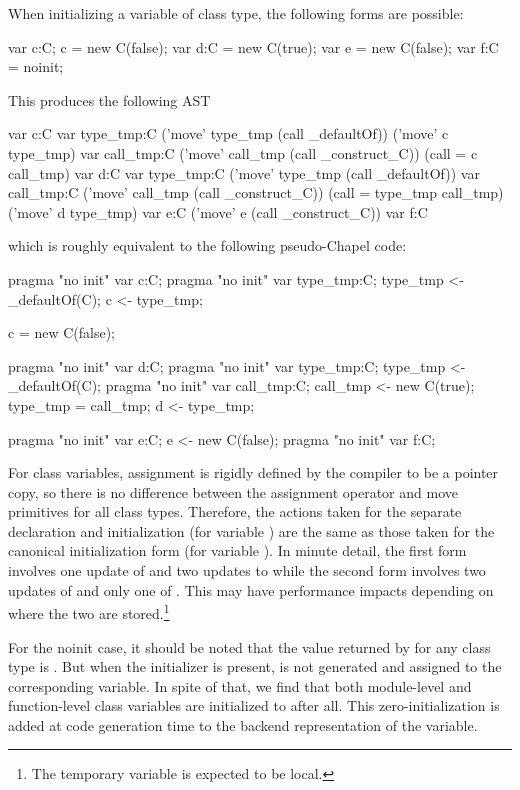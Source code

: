 When initializing a variable of class type, the following forms are possible:
\begin{chapel}
  var c:C; c = new C(false);
  var d:C = new C(true);
  var e = new C(false);
  var f:C = noinit;
\end{chapel}
\noindent
This produces the following AST
\begin{numberedchapel}
    var c:C
    {
      var type_tmp:C
      ('move' type_tmp (call _defaultOf))
      ('move' c type_tmp)
    }
    var call_tmp:C
    ('move' call_tmp (call _construct_C))
    (call = c call_tmp)
    var d:C
    {
      var type_tmp:C
      ('move' type_tmp (call _defaultOf))
      var call_tmp:C
      ('move' call_tmp (call _construct_C))
      (call = type_tmp call_tmp)
      ('move' d type_tmp)
    }
    var e:C
    ('move' e (call _construct_C))
    var f:C
\end{numberedchapel}
\noindent
which is roughly equivalent to the following pseudo-Chapel code:
\begin{chapel}
  pragma "no init" var c:C;
  pragma "no init" var type_tmp:C; type_tmp <- _defaultOf(C);
  c <- type_tmp;

  c = new C(false);

  pragma "no init" var d:C; 
  pragma "no init" var type_tmp:C; type_tmp <- _defaultOf(C);
  pragma "no init" var call_tmp:C; call_tmp <- new C(true);
  type_tmp = call_tmp;
  d <- type_tmp;

  pragma "no init" var e:C; e <- new C(false);
  pragma "no init" var f:C;
\end{chapel}
\noindent
For class variables, assignment is rigidly defined by the compiler to be a pointer copy,
so there is no difference between the assignment operator and move primitives for all
class types.  Therefore, the actions taken for the separate declaration and initialization
(for variable ) are the same as those taken for the canonical initialization form
(for variable ).  In minute detail, the first form involves one update of
 and two updates to  while the second form involves two updates of
 and only one of .  This may have performance impacts depending on
where the two are stored.\footnote{The temporary variable  is expected to
  be local.}

For the noinit case, it should be noted that the value returned by  for
any class type is .  But when the  initializer is present,
 is not generated and assigned to the corresponding variable.  In spite of
that, we find that both module-level and function-level class variables are initialized to
 after all.  This zero-initialization is added at code generation time to the
backend representation of the variable.  

